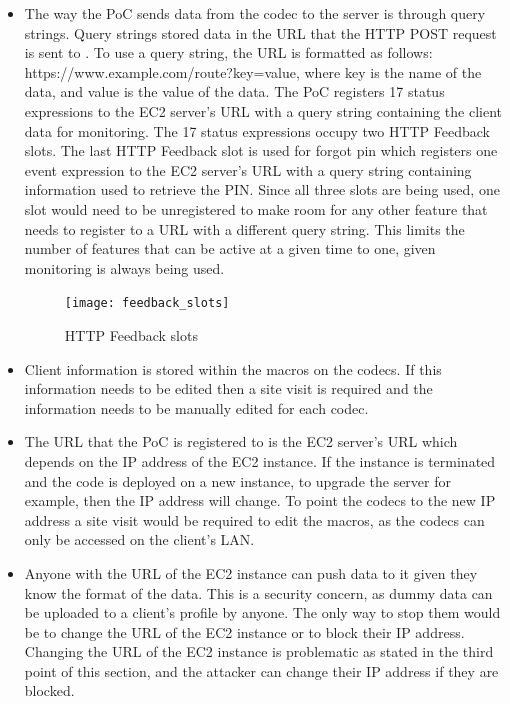 \documentclass[letterpaper,12pt]{article}
\begin{document}
\begin{itemize}
	\item The way the PoC sends data from the codec to the server is through query strings. Query strings stored data in the URL that the HTTP POST request is sent to \cite{querystring}. To use a query string, the URL is formatted as follows: https://www.example.com/route?key=value, where key is the name of the data, and value is the value of the data. The PoC registers 17 status expressions to the EC2 server's URL with a query string containing the client data for monitoring. The 17 status expressions occupy two HTTP Feedback slots. The last HTTP Feedback slot is used for forgot pin which registers one event expression to the EC2 server's URL with a query string containing information used to retrieve the PIN. Since all three slots are being used, one slot would need to be unregistered to make room for any other feature that needs to register to a URL with a different query string. This limits the number of features that can be active at a given time to one, given monitoring is always being used.
    \begin{figure}[H]
    	\centering \texttt{[image: feedback\_slots]}
    	\caption{\label{fig:httpfeedbackslots}HTTP Feedback slots}
    \end{figure}
	\item Client information is stored within the macros on the codecs. If this information needs to be edited then a site visit is required  and the information needs to be manually edited for each codec.
	\item The URL that the PoC is registered to is the EC2 server's URL which depends on the IP address of the EC2 instance. If the instance is terminated and the code is deployed on a new instance, to upgrade the server for example, then the IP address will change. To point the codecs to the new IP address a site visit would be required to edit the macros, as the codecs can only be accessed on the client's LAN.
	\item Anyone with the URL of the EC2 instance can push data to it given they know the format of the data. This is a security concern, as dummy data can be uploaded to a client's profile by anyone. The only way to stop them would be to change the URL of the EC2 instance or to block their IP address. Changing the URL of the EC2 instance is problematic as stated in the third point of this section, and the attacker can change their IP address if they are blocked.
    
\end{itemize}
\end{document}
